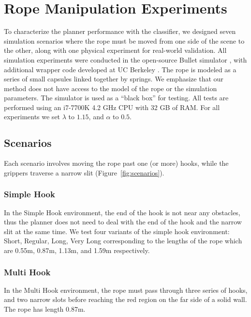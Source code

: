 

\section{Rope Manipulation Experiments}


To characterize the planner performance with the classifier, we designed seven simulation scenarios where the rope must be moved from one side of the scene to the other, along with one physical experiment for real-world validation.
All simulation experiments were conducted in the open-source Bullet simulator \cite{Coumans2010}, with additional wrapper code developed at UC Berkeley \cite{ucberkley_bullet}. The rope is modeled as a series of small capsules linked together by springs. We emphasize that our method does not have access to the model of the rope or the simulation parameters. The simulator is used as a ``black box'' for testing. All tests are performed using an i7-7700K 4.2 GHz CPU with 32 GB of RAM. For all experiments we set $\lambda$ to $1.15$, and $\alpha$ to $0.5$.



\subsection{Scenarios}


Each scenario involves moving the rope past one (or more) hooks, while the grippers traverse a narrow slit (Figure~\ref{fig:scenarios}).

\subsubsection{Simple Hook}

In the Simple Hook environment, the end of the hook is not near any obstacles, thus the planner does not need to deal with the end of the hook and the narrow slit at the same time. We test four variants of the simple hook environment: Short, Regular, Long, Very Long corresponding to the lengths of the rope which are 0.55m, 0.87m, 1.13m, and 1.59m respectively.

\subsubsection{Multi Hook}

In the Multi Hook environment, the rope must pass through three series of hooks, and two narrow slots before reaching the red region on the far side of a solid wall. The rope has length 0.87m.

